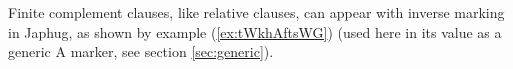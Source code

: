 \documentclass[oldfontcommands,oneside,a4paper,11pt]{article}
\newcommand{\ipa}[1]{{\phon#1}} %
\newcommand{\refb}[1]{(\ref{#1})}
\newcommand{\factual}[1]{\textsc{:fact}}
\begin{document}
Finite complement clauses, like relative clauses, can appear with inverse marking in Japhug, as shown by example \refb{ex:tWkhAftsWG} (used here in its value as a generic A marker, see section \ref{sec:generic}).

%
%
%
%
%
%
%
%
\end{document}
